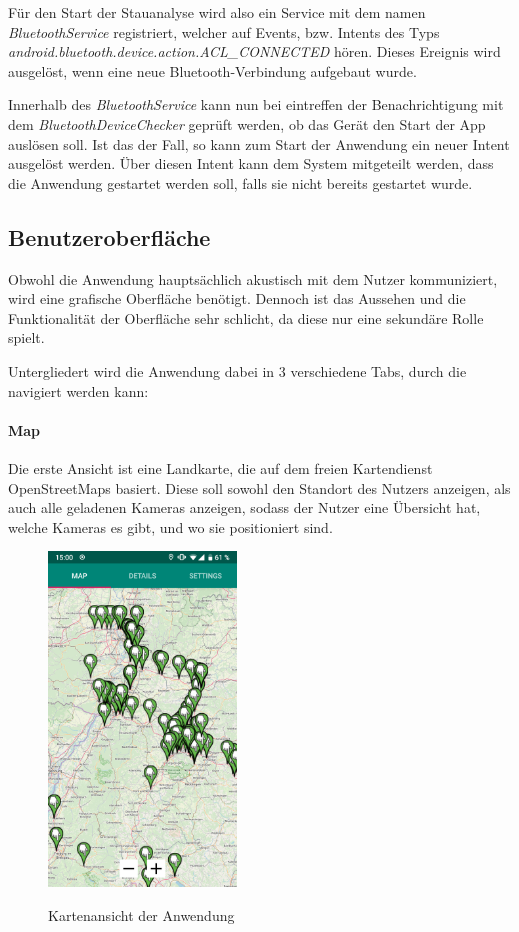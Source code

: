 Für den Start der Stauanalyse wird also ein Service mit dem namen {\em BluetoothService} registriert, welcher auf Events, bzw. Intents des Typs {\em android.bluetooth.device.action.ACL\_CONNECTED} hören. Dieses Ereignis wird ausgelöst, wenn eine neue Bluetooth-Verbindung aufgebaut wurde.

Innerhalb des {\em BluetoothService} kann nun bei eintreffen der Benachrichtigung mit dem {\em BluetoothDeviceChecker} geprüft werden, ob das Gerät den Start der App auslösen soll. Ist das der Fall, so kann zum Start der Anwendung ein neuer Intent ausgelöst werden. Über diesen Intent kann dem System mitgeteilt werden, dass die Anwendung gestartet werden soll, falls sie nicht bereits gestartet wurde.

\subsection{Benutzeroberfläche}
Obwohl die Anwendung hauptsächlich akustisch mit dem Nutzer kommuniziert, wird eine grafische Oberfläche benötigt.
Dennoch ist das Aussehen und die Funktionalität der Oberfläche sehr schlicht, da diese nur eine sekundäre Rolle spielt.

Untergliedert wird die Anwendung dabei in 3 verschiedene Tabs, durch die navigiert werden kann:

\paragraph*{Map}
Die erste Ansicht ist eine Landkarte, die auf dem freien Kartendienst OpenStreetMaps basiert. %
Diese soll sowohl den Standort des Nutzers anzeigen, als auch alle geladenen Kameras anzeigen, sodass der Nutzer eine Übersicht hat,
welche Kameras es gibt, und wo sie positioniert sind.

\begin{figure}[ht]
   \centering
     \includegraphics[width=5cm]{Bilder/app-map} \\
 \caption{Kartenansicht der Anwendung}
\end{figure}

